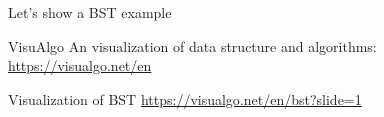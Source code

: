 \documentclass[aspectratio=169]{beamer}
\begin{document}




\begin{frame}{Let's show a BST example}
    \begin{block}{VisuAlgo}
         An visualization of data structure and algorithms: \url{https://visualgo.net/en}
    \end{block}
    \begin{block}{Visualization of BST}
        \url{https://visualgo.net/en/bst?slide=1}
    \end{block}
\end{frame}
\end{document}
